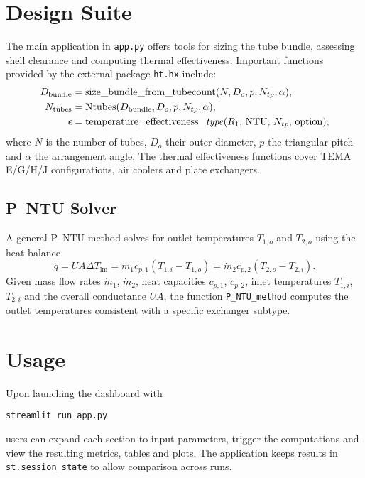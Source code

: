 \documentclass{article}
\begin{document}
\section{Design Suite}
The main application in \texttt{app.py} offers tools for sizing the tube bundle, assessing shell clearance and computing thermal effectiveness. Important functions provided by the external package \texttt{ht.hx} include:
\begin{align}
D_{\text{bundle}} &= \text{size\_bundle\_from\_tubecount}(N, D_o, p, N_{tp}, \alpha),\\
N_{\text{tubes}} &= \text{Ntubes}(D_{\text{bundle}}, D_o, p, N_{tp}, \alpha),\\
\epsilon &= \text{temperature\_effectiveness\_\textit{type}}(R_1,\,\text{NTU},\,N_{tp},\,\text{option}),
\end{align}
where $N$ is the number of tubes, $D_o$ their outer diameter, $p$ the triangular pitch and $\alpha$ the arrangement angle. The thermal effectiveness functions cover TEMA E/G/H/J configurations, air coolers and plate exchangers.
\subsection{P--NTU Solver}
A general P--NTU method solves for outlet temperatures $T_{1,o}$ and $T_{2,o}$ using the heat balance
\begin{equation}
q = U A \Delta T_{\text{lm}} = \dot m_1 c_{p,1}(T_{1,i} - T_{1,o}) = \dot m_2 c_{p,2}(T_{2,o} - T_{2,i}).
\end{equation}
Given mass flow rates $\dot m_1$, $\dot m_2$, heat capacities $c_{p,1}$, $c_{p,2}$, inlet temperatures $T_{1,i}$, $T_{2,i}$ and the overall conductance $UA$, the function \texttt{P\_NTU\_method} computes the outlet temperatures consistent with a specific exchanger subtype.
\section{Usage}
Upon launching the dashboard with
\begin{verbatim}
streamlit run app.py
\end{verbatim}
users can expand each section to input parameters, trigger the computations and view the resulting metrics, tables and plots. The application keeps results in \texttt{st.session\_state} to allow comparison across runs.
\end{document}
